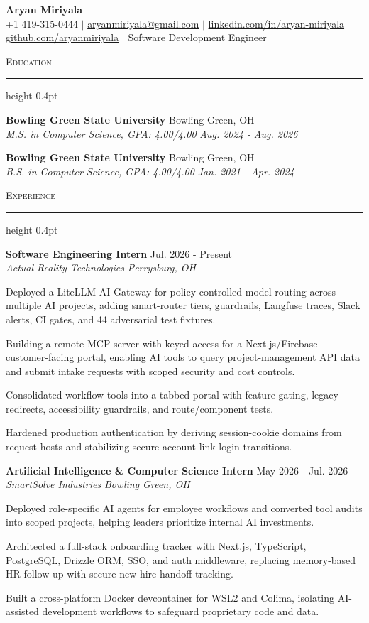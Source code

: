\documentclass[letterpaper,11pt]{article}
\newcommand{\resumesection}[1]{%
  \par\vspace{2pt}%
  {\large\scshape #1}\par\vspace{2pt}%
  \hrule height 0.4pt\vspace{2pt}%
}
\newcommand{\resumeSubheading}[4]{
  \textbf{#1} \hfill #2\\
  \textit{#3} \hfill \textit{#4}
}
\begin{document}
\begin{center}
  {\LARGE \textbf{Aryan Miriyala}}\\[2pt]
  \small
  +1 419-315-0444 $|$ \href{mailto:aryanmiriyala@gmail.com}{aryanmiriyala@gmail.com} $|$ \href{https://www.linkedin.com/in/aryan-miriyala-7788a21b6/}{linkedin.com/in/aryan-miriyala}\\
  \href{https://github.com/aryanmiriyala}{github.com/aryanmiriyala} $|$ Software Development Engineer
\end{center}\vspace{-6pt}

\resumesection{Education}
\resumeSubheading
{Bowling Green State University}{Bowling Green, OH}
{M.S. in Computer Science, GPA: 4.00/4.00}{Aug. 2024 - Aug. 2026}

\resumeSubheading
{Bowling Green State University}{Bowling Green, OH}
{B.S. in Computer Science, GPA: 4.00/4.00}{Jan. 2021 - Apr. 2024}

\resumesection{Experience}
\resumeSubheading
{Software Engineering Intern}{Jul. 2026 - Present}
{Actual Reality Technologies}{Perrysburg, OH}
\begin{tightitemize}
  \item Deployed a LiteLLM AI Gateway for policy-controlled model routing across multiple AI projects, adding smart-router tiers, guardrails, Langfuse traces, Slack alerts, CI gates, and 44 adversarial test fixtures.
  \item Building a remote MCP server with keyed access for a Next.js/Firebase customer-facing portal, enabling AI tools to query project-management API data and submit intake requests with scoped security and cost controls.
  \item Consolidated workflow tools into a tabbed portal with feature gating, legacy redirects, accessibility guardrails, and route/component tests.
  \item Hardened production authentication by deriving session-cookie domains from request hosts and stabilizing secure account-link login transitions.
\end{tightitemize}

\resumeSubheading
{Artificial Intelligence \& Computer Science Intern}{May 2026 - Jul. 2026}
{SmartSolve Industries}{Bowling Green, OH}
\begin{tightitemize}
  \item Deployed role-specific AI agents for employee workflows and converted tool audits into scoped projects, helping leaders prioritize internal AI investments.
  \item Architected a full-stack onboarding tracker with Next.js, TypeScript, PostgreSQL, Drizzle ORM, SSO, and auth middleware, replacing memory-based HR follow-up with secure new-hire handoff tracking.
  \item Built a cross-platform Docker devcontainer for WSL2 and Colima, isolating AI-assisted development workflows to safeguard proprietary code and data.
\end{tightitemize}
\end{document}
